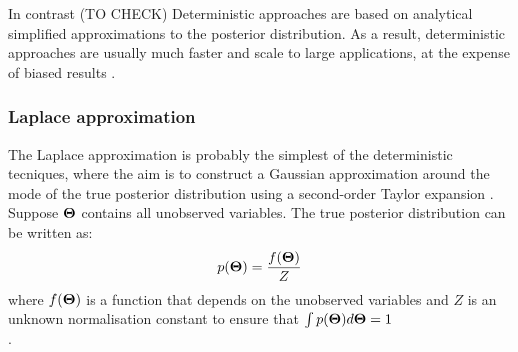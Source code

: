 In contrast
(TO CHECK) Deterministic approaches are based on analytical simplified approximations to the posterior distribution. As a result, deterministic approaches are usually much faster and scale to large applications, at the expense of biased results \cite{bishop,murphy}. 

\subsubsection{Laplace approximation}
The Laplace approximation is probably the simplest of the deterministic tecniques, where the aim is to construct a Gaussian approximation around the mode of the true posterior distribution using a second-order Taylor expansion \cite{Bishop,Murphy}.\\
Suppose $\mbox{\boldmath $\Theta$}$ contains all unobserved variables. The true posterior distribution can be written as:
\[
p(\mbox{\boldmath $\Theta$}) = \frac{f(\mbox{\boldmath $\Theta$})}{Z}
\]
where $f(\mbox{\boldmath $\Theta$})$ is a function that depends on the unobserved variables and $Z$ is an unknown normalisation constant to ensure that $\int p(\mbox{\boldmath $\Theta$}) d\mbox{\boldmath $\Theta$} = 1$\\.\\

